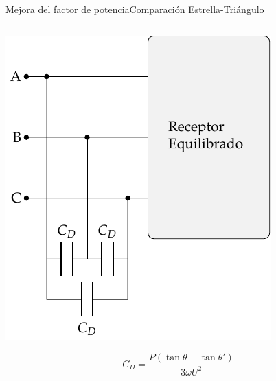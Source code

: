 \documentclass[aspectratio=169, xcolor={usenames,svgnames,dvipsnames}]{beamer}
\begin{document}
\begin{frame}{Mejora del factor de potencia}{Comparación Estrella-Triángulo}
\begin{columns}
\begin{column}{0.5\columnwidth}
\begin{center}
\includegraphics[height=0.55\textheight]{../figs/CircuitoTrifasica_CompensacionReactiva.pdf}
\end{center}
\[
  \boxed{C_D = \frac{P(\tan \theta - \tan \theta')}{3 \omega U^2}}
\]
\end{column}


\end{columns}
\end{frame}
\end{document}

